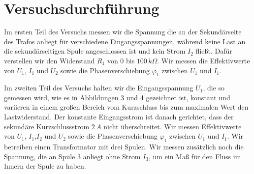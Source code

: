 \documentclass[a4paper, 12pt,]{scrartcl}
\begin{document}
\section{Versuchsdurchführung}
Im ersten Teil des Versuchs messen wir die Spannung die an der Sekundärseite des Trafos anliegt für verschiedene Eingangsspannungen, während keine Last an die sekundärseitigen Spule angeschlossen ist und kein Strom $I_2$ fließt. Dafür verstellen wir den Widerstand $R_1$ von 0 bis $100\,k\Omega$. Wir messen die Effektivwerte von $U_1$, $I_1$ und $U_2$ sowie die Phasenverschiebung $\varphi_1$ zwischen $U_1$ und $I_1$.\newline\newline

Im zweiten Teil des Versuchs halten wir die Eingangsspannung $U_1$, die so gemessen wird, wie es in Abbildungen 3 und 4 gezeichnet ist, konstant und variieren in einem großen Bereich vom Kurzschluss bis zum maximalen Wert den Lastwiderstand. Der konstante Eingangsstrom ist danach gerichtet, dass der sekundäre Kurzschlussstrom $2\,A$ nicht überschreitet. Wir messen Effektivwerte von $U_1$, $I_1$,$I_2$ und $U_2$ sowie die Phasenverschiebung $\varphi_1$ zwischen $U_1$ und $I_1$. Wir betreiben einen Transformator mit drei Spulen. Wir messen zusätzlich noch die Spannung, die an Spule 3 anliegt ohne Strom $I_3$, um ein Maß für den Fluss im Innern der Spule zu haben.
\end{document}
